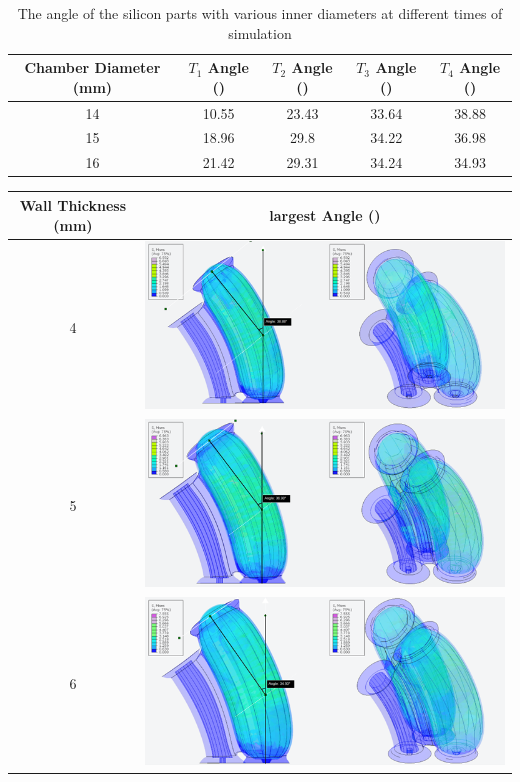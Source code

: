 \documentclass[twoside]{article}
\begin{document}
\begin{table} [H]
	\centering
	\begin{tabular}{|c|c|c|c|c|}
	\hline
	Chamber Diameter (mm) & $T_{1}$ Angle (\degree) & $T_{2}$ Angle (\degree) & $T_{3}$ Angle (\degree) & $T_{4}$ Angle (\degree)\\
	\hline
	14 & 10.55 & 23.43 & 33.64 & 38.88\\
	\hline
	15 & 	18.96 & 	29.8 & 	34.22	 & 36.98\\
	\hline
	16	 & 21.42	 & 29.31	 & 34.24	 & 34.93\\
	\hline
	\end{tabular}
	\caption{The angle of the silicon parts with various inner diameters at different times of simulation}
\end{table}

\begin{table} [H]
	\centering
	\begin{tabular}{|c|c|}
	\hline
	Wall Thickness (mm) & largest Angle (\degree)\\
	\hline
	4 & \includegraphics[align=c, scale=0.75]{d14}\\
	\hline
	5 & \includegraphics[align=c, scale=0.75]{d15}\\
	\hline
	6 & \includegraphics[align=c, scale=0.75]{d16}\\

\end{tabular}
\end{table}
\end{document}

